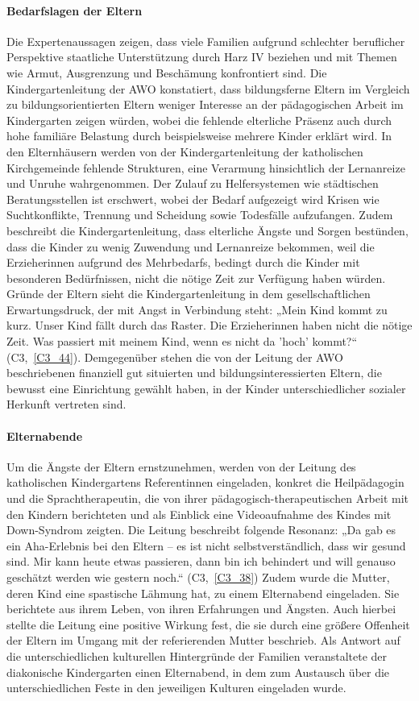 \paragraph{Bedarfslagen der Eltern}
Die Expertenaussagen zeigen, dass viele Familien aufgrund schlechter beruflicher Perspektive staatliche Unterstützung durch Harz IV beziehen und mit Themen wie Armut, Ausgrenzung und Beschämung konfrontiert sind. Die Kindergartenleitung der AWO konstatiert, dass bildungsferne Eltern im Vergleich zu bildungsorientierten Eltern weniger Interesse an der pädagogischen Arbeit im Kindergarten zeigen würden, wobei die fehlende elterliche Präsenz auch durch hohe familiäre Belastung durch beispielsweise mehrere Kinder erklärt wird.
In den Elternhäusern werden von der Kindergartenleitung der katholischen Kirchgemeinde fehlende Strukturen, eine Verarmung hinsichtlich der Lernanreize und Unruhe wahrgenommen. Der Zulauf zu Helfersystemen wie städtischen Beratungsstellen ist erschwert, wobei der Bedarf aufgezeigt wird Krisen wie Suchtkonflikte, Trennung und Scheidung sowie Todesfälle aufzufangen. 
Zudem beschreibt die Kindergartenleitung, dass elterliche Ängste und Sorgen bestünden, dass die Kinder zu wenig Zuwendung und Lernanreize bekommen, weil die Erzieherinnen aufgrund des Mehrbedarfs, bedingt durch die Kinder mit besonderen Bedürfnissen, nicht die nötige Zeit zur Verfügung haben würden. Gründe der Eltern sieht die Kindergartenleitung in dem gesellschaftlichen Erwartungsdruck, der mit Angst in Verbindung steht: „Mein Kind kommt zu kurz. Unser Kind fällt durch das Raster. Die Erzieherinnen haben nicht die nötige Zeit. Was passiert mit meinem Kind, wenn es nicht da 'hoch' kommt?“ (C3,~\ref{C3_44}). Demgegenüber stehen die von der Leitung der AWO beschriebenen finanziell gut situierten und bildungsinteressierten Eltern, die bewusst eine Einrichtung gewählt haben, in der Kinder unterschiedlicher sozialer Herkunft vertreten sind.

\paragraph{Elternabende}
Um die Ängste der Eltern ernstzunehmen, werden von der Leitung des katholischen Kindergartens Referentinnen eingeladen, konkret die Heilpädagogin und die Sprachtherapeutin, die von ihrer pädagogisch-therapeutischen Arbeit mit den Kindern berichteten und als Einblick eine Videoaufnahme des Kindes mit Down-Syndrom  zeigten. Die Leitung beschreibt folgende Resonanz: „Da gab es ein Aha-Erlebnis bei den Eltern -- es ist nicht selbstverständlich, dass wir gesund sind. Mir kann heute etwas passieren, dann bin ich behindert und will genauso geschätzt werden wie gestern noch.“ (C3,~\ref{C3_38}) Zudem wurde die Mutter, deren Kind eine spastische Lähmung hat, zu einem Elternabend eingeladen. Sie berichtete aus ihrem Leben, von ihren Erfahrungen und Ängsten. Auch hierbei stellte die Leitung eine positive Wirkung fest, die sie durch eine größere Offenheit der Eltern im Umgang mit der referierenden Mutter beschrieb. 
Als Antwort auf die unterschiedlichen kulturellen Hintergründe der Familien veranstaltete der diakonische Kindergarten einen Elternabend, in dem zum Austausch über die unterschiedlichen Feste in den jeweiligen Kulturen eingeladen wurde. 

